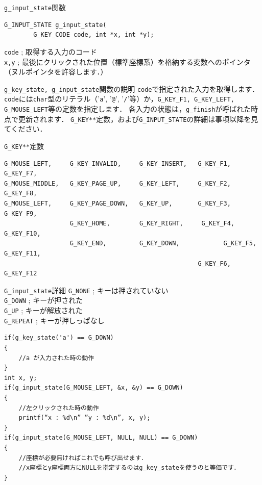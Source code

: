 \documentclass[platex,a4paper,12pt]{jsarticle}%
\begin{document}
\begin{itembox}[l]{\texttt{g\_input\_state}関数}
\begin{verbatim}
G_INPUT_STATE g_input_state(
        G_KEY_CODE code, int *x, int *y);
\end{verbatim}
\verb|code| ; 取得する入力のコード\\
\verb|x,y| ; 最後にクリックされた位置（標準座標系）を格納する変数へのポインタ（ヌルポインタを許容します．）
\end{itembox}

\begin{itembox}[l]{\texttt{g\_key\_state, g\_input\_state}関数の説明}
\verb|code|で指定された入力を取得します．
\verb|code|には\verb|char|型のリテラル（'\verb|a|', '\verb|@|', '\verb|/|'等）か，\verb|G_KEY_F1, G_KEY_LEFT, G_MOUSE_LEFT|等の定数を指定します．
各入力の状態は，\verb|g_finish|が呼ばれた時点で更新されます．
\verb|G_KEY**|定数，および\verb|G_INPUT_STATE|の詳細は事項以降を見てください．
\end{itembox}

\begin{itembox}[l]{\texttt{G\_KEY**}定数}
\begin{verbatim}
G_MOUSE_LEFT,     G_KEY_INVALID,     G_KEY_INSERT,   G_KEY_F1, 	G_KEY_F7,
G_MOUSE_MIDDLE,   G_KEY_PAGE_UP,     G_KEY_LEFT,     G_KEY_F2, 	G_KEY_F8,
G_MOUSE_LEFT,     G_KEY_PAGE_DOWN,   G_KEY_UP,       G_KEY_F3, 	G_KEY_F9,
                  G_KEY_HOME,        G_KEY_RIGHT, 	  G_KEY_F4, 	G_KEY_F10,
                  G_KEY_END,         G_KEY_DOWN,	    	G_KEY_F5, 	G_KEY_F11,
                                                     G_KEY_F6,	  G_KEY_F12
 \end{verbatim}
\end{itembox}
\begin{itembox}[l]{\texttt{G\_input\_state}詳細}
\verb|G_NONE| ; キーは押されていない\\
\verb|G_DOWN| ; キーが押された\\
\verb|G_UP| ; キーが解放された\\
\verb|G_REPEAT| ; キーが押しっぱなし
\begin{verbatim}
if(g_key_state('a') == G_DOWN)
{
    //a が入力された時の動作
}
int x, y;
if(g_input_state(G_MOUSE_LEFT, &x, &y) == G_DOWN)
{
    //左クリックされた時の動作
    printf(“x : %d\n” ”y : %d\n”, x, y);
}
if(g_input_state(G_MOUSE_LEFT, NULL, NULL) == G_DOWN)
{
    //座標が必要無ければこれでも呼び出せます．
    //x座標とy座標両方にNULLを指定するのはg_key_stateを使うのと等価です．
}
\end{verbatim}
\end{itembox}
\end{document}
